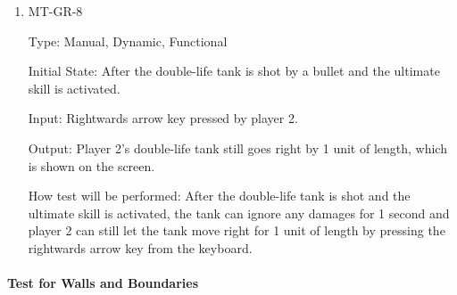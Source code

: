 \documentclass[12pt, titlepage]{article}
\begin{document}
\begin{enumerate}
\item{MT-GR-8\\}

Type: Manual, Dynamic, Functional
					
Initial State: After the double-life tank is shot by a bullet and the ultimate skill is activated.
					
Input: Rightwards arrow key pressed by player 2.
					
Output: Player 2's double-life tank still goes right by 1 unit of length, which is shown on the screen.
					
How test will be performed: After the double-life tank is shot and the ultimate skill is activated, the tank can ignore any damages for 1 second and player 2 can still let the tank move right for 1 unit of length by pressing the rightwards arrow key from the keyboard.

\end{enumerate}

\paragraph{Test for Walls and Boundaries}
\end{document}
